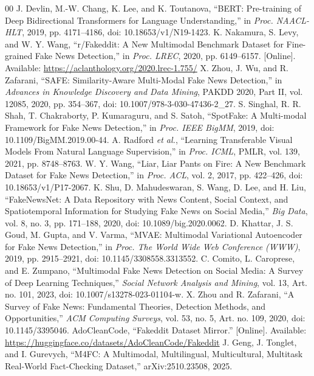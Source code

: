 \documentclass[conference]{IEEEtran}
\begin{document}
\begin{thebibliography}{00}
 J. Devlin, M.-W. Chang, K. Lee, and K. Toutanova, ``BERT: Pre-training of Deep Bidirectional Transformers for Language Understanding,'' in \emph{Proc. NAACL-HLT}, 2019, pp. 4171--4186, doi: 10.18653/v1/N19-1423.
 K. Nakamura, S. Levy, and W. Y. Wang, ``r/Fakeddit: A New Multimodal Benchmark Dataset for Fine-grained Fake News Detection,'' in \emph{Proc. LREC}, 2020, pp. 6149--6157. [Online]. Available: \url{https://aclanthology.org/2020.lrec-1.755/}
 X. Zhou, J. Wu, and R. Zafarani, ``SAFE: Similarity-Aware Multi-Modal Fake News Detection,'' in \emph{Advances in Knowledge Discovery and Data Mining}, PAKDD 2020, Part II, vol. 12085, 2020, pp. 354--367, doi: 10.1007/978-3-030-47436-2\_27.
 S. Singhal, R. R. Shah, T. Chakraborty, P. Kumaraguru, and S. Satoh, ``SpotFake: A Multi-modal Framework for Fake News Detection,'' in \emph{Proc. IEEE BigMM}, 2019, doi: 10.1109/BigMM.2019.00-44.
 A. Radford \emph{et al.}, ``Learning Transferable Visual Models From Natural Language Supervision,'' in \emph{Proc. ICML}, PMLR, vol. 139, 2021, pp. 8748--8763.
 W. Y. Wang, ``Liar, Liar Pants on Fire: A New Benchmark Dataset for Fake News Detection,'' in \emph{Proc. ACL}, vol. 2, 2017, pp. 422--426, doi: 10.18653/v1/P17-2067.
 K. Shu, D. Mahudeswaran, S. Wang, D. Lee, and H. Liu, ``FakeNewsNet: A Data Repository with News Content, Social Context, and Spatiotemporal Information for Studying Fake News on Social Media,'' \emph{Big Data}, vol. 8, no. 3, pp. 171--188, 2020, doi: 10.1089/big.2020.0062.
 D. Khattar, J. S. Goud, M. Gupta, and V. Varma, ``MVAE: Multimodal Variational Autoencoder for Fake News Detection,'' in \emph{Proc. The World Wide Web Conference (WWW)}, 2019, pp. 2915--2921, doi: 10.1145/3308558.3313552.
 C. Comito, L. Caroprese, and E. Zumpano, ``Multimodal Fake News Detection on Social Media: A Survey of Deep Learning Techniques,'' \emph{Social Network Analysis and Mining}, vol. 13, Art. no. 101, 2023, doi: 10.1007/s13278-023-01104-w.
 X. Zhou and R. Zafarani, ``A Survey of Fake News: Fundamental Theories, Detection Methods, and Opportunities,'' \emph{ACM Computing Surveys}, vol. 53, no. 5, Art. no. 109, 2020, doi: 10.1145/3395046.
 AdoCleanCode, ``Fakeddit Dataset Mirror.'' [Online]. Available: \url{https://huggingface.co/datasets/AdoCleanCode/Fakeddit}
 J. Geng, J. Tonglet, and I. Gurevych, ``M4FC: A Multimodal, Multilingual, Multicultural, Multitask Real-World Fact-Checking Dataset,'' arXiv:2510.23508, 2025.

\end{thebibliography}
\end{document}
